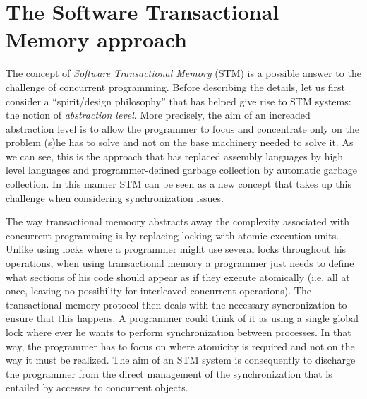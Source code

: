 \section{The Software Transactional Memory approach}
The concept of {\it Software Transactional  Memory}   (STM)  is  a possible answer  
to   the  challenge of concurrent programming.
Before describing the details, let us first consider a ``spirit/design philosophy'' that has helped give
rise to  STM systems: the notion of 
{\it abstraction level}.
More precisely,  the  aim of an increaded abstraction level is   to allow  the programmer  to  focus and
concentrate only  on the problem  (s)he has to
solve and not on the base machinery needed to solve it. 
As we can see, this is the approach  that  has   replaced assembly languages  
by  high level languages and programmer-defined garbage collection 
by automatic garbage collection.
In this manner STM can  be seen as a  new concept
that takes  up  this challenge when considering synchronization issues.

The way transactional memoory abstracts away the  complexity associated with 
concurrent programming is   by  replacing locking  with  atomic
execution units.
Unlike using locks where a programmer might use several locks
throughout his operations, when using transactional memory
a programmer just needs to define what sections of his code should
appear as if they execute atomically (i.e. all at once, leaving
no possibility for interleaved concurrent operations).
The transactional memory protocol then deals with the necessary
syncronization to ensure that this happens.
A programmer could think of it as using a single global lock
where ever he wants to perform synchronization between processes.
In  that way, the programmer has to focus on  where 
atomicity is required and  not on the  way it must be realized. The aim of
an STM system is consequently  to  discharge the programmer from the direct 
management  of  the  synchronization  that  is entailed  by   accesses   to
concurrent  objects.  

